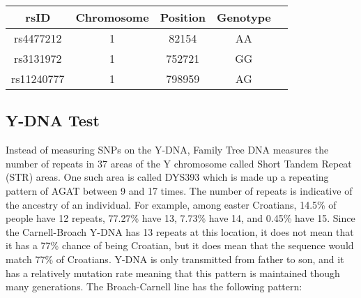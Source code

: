 \documentclass[11pt,letter]{book}
\begin{document}
\begin{center}
\begin{tabular}{c | c | c | c | c}
	rsID & Chromosome & Position & Genotype \\
	\hline
	rs4477212 & 1 & 82154 & AA \\
	rs3131972	& 1 & 752721 & GG \\
	rs11240777 & 1 & 798959 & AG \\
\end{tabular}
\end{center}

\subsection{Y-DNA Test}

Instead of measuring SNPs on the Y-DNA, Family Tree DNA measures the number of repeats in 37 areas of the Y chromosome called Short Tandem Repeat (STR) areas.  One such area is called DYS393 which is made up a repeating pattern of AGAT between 9 and 17 times.  The number of repeats is indicative of the ancestry of an individual.  For example, among easter Croatians, 14.5\% of people have 12 repeats, 77.27\% have 13, 7.73\% have 14, and 0.45\% have 15.  Since the Carnell-Broach Y-DNA has 13 repeats at this location, it does not mean that it has a 77\% chance of being Croatian, but it does mean that the sequence would match 77\% of Croatians.
Y-DNA is only transmitted from father to son, and it has a relatively mutation rate meaning that this pattern is maintained though many generations.  The Broach-Carnell line has the following pattern:
\end{document}
